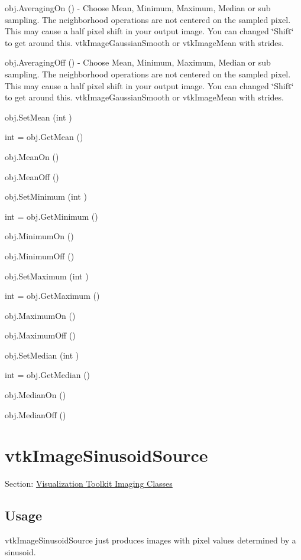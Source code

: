 \begin{DoxyItemize}
\item {\ttfamily obj.\-Averaging\-On ()} -\/ Choose Mean, Minimum, Maximum, Median or sub sampling. The neighborhood operations are not centered on the sampled pixel. This may cause a half pixel shift in your output image. You can changed \char`\"{}\-Shift\char`\"{} to get around this. vtk\-Image\-Gaussian\-Smooth or vtk\-Image\-Mean with strides.  
\item {\ttfamily obj.\-Averaging\-Off ()} -\/ Choose Mean, Minimum, Maximum, Median or sub sampling. The neighborhood operations are not centered on the sampled pixel. This may cause a half pixel shift in your output image. You can changed \char`\"{}\-Shift\char`\"{} to get around this. vtk\-Image\-Gaussian\-Smooth or vtk\-Image\-Mean with strides.  
\item {\ttfamily obj.\-Set\-Mean (int )}  
\item {\ttfamily int = obj.\-Get\-Mean ()}  
\item {\ttfamily obj.\-Mean\-On ()}  
\item {\ttfamily obj.\-Mean\-Off ()}  
\item {\ttfamily obj.\-Set\-Minimum (int )}  
\item {\ttfamily int = obj.\-Get\-Minimum ()}  
\item {\ttfamily obj.\-Minimum\-On ()}  
\item {\ttfamily obj.\-Minimum\-Off ()}  
\item {\ttfamily obj.\-Set\-Maximum (int )}  
\item {\ttfamily int = obj.\-Get\-Maximum ()}  
\item {\ttfamily obj.\-Maximum\-On ()}  
\item {\ttfamily obj.\-Maximum\-Off ()}  
\item {\ttfamily obj.\-Set\-Median (int )}  
\item {\ttfamily int = obj.\-Get\-Median ()}  
\item {\ttfamily obj.\-Median\-On ()}  
\item {\ttfamily obj.\-Median\-Off ()}  
\end{DoxyItemize}\hypertarget{vtkimaging_vtkimagesinusoidsource}{}\section{vtk\-Image\-Sinusoid\-Source}\label{vtkimaging_vtkimagesinusoidsource}
Section\-: \hyperlink{sec_vtkimaging}{Visualization Toolkit Imaging Classes} \hypertarget{vtkwidgets_vtkxyplotwidget_Usage}{}\subsection{Usage}\label{vtkwidgets_vtkxyplotwidget_Usage}
vtk\-Image\-Sinusoid\-Source just produces images with pixel values determined by a sinusoid.

